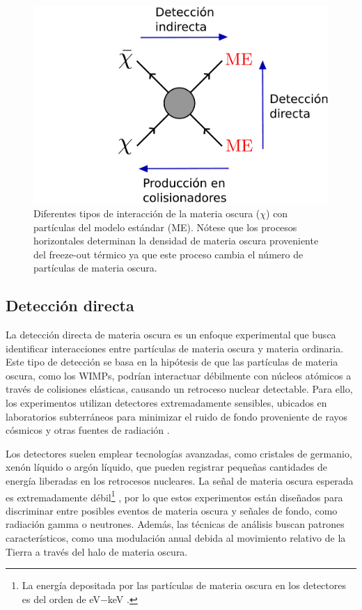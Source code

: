 \begin{figure}[h]
\centering
\includegraphics[scale=0.45]{Images/DM-searches.pdf}
\caption[Interacciones de la materia oscura]{Diferentes tipos de interacción de la materia oscura ($\chi$) con partículas del modelo estándar (ME). Nótese que los procesos horizontales determinan la densidad de materia oscura proveniente del freeze-out térmico ya que este proceso cambia el número de partículas de materia oscura.}
\label{fig_DMsearches}
\end{figure}


\subsection[\hspace{-0.4in}) Detección directa]{Detección directa}
La detección directa de materia oscura es un enfoque experimental que busca identificar interacciones entre partículas de materia oscura y materia ordinaria. Este tipo de detección se basa en la hipótesis de que las partículas de materia oscura, como los WIMPs, podrían interactuar débilmente con núcleos atómicos a través de colisiones elásticas, causando un retroceso nuclear detectable. Para ello, los experimentos utilizan detectores extremadamente sensibles, ubicados en laboratorios subterráneos para minimizar el ruido de fondo proveniente de rayos cósmicos y otras fuentes de radiación \cite{profumo2017introduction}. 

Los detectores suelen emplear tecnologías avanzadas, como cristales de germanio, xenón líquido o argón líquido, que pueden registrar pequeñas cantidades de energía liberadas en los retrocesos nucleares. La señal de materia oscura esperada es extremadamente débil\footnote{La energía depositada por las partículas de materia oscura en los detectores es del orden de eV$-$keV \cite{Cirelli:2024ssz}.} , por lo que estos experimentos están diseñados para discriminar entre posibles eventos de materia oscura y señales de fondo, como radiación gamma o neutrones. Además, las técnicas de análisis buscan patrones característicos, como una modulación anual debida al movimiento relativo de la Tierra a través del halo de materia oscura.

